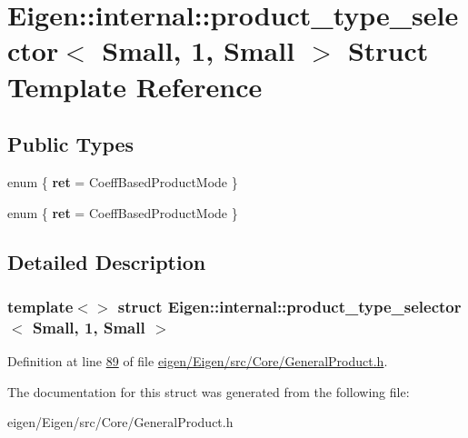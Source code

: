 \hypertarget{struct_eigen_1_1internal_1_1product__type__selector_3_01_small_00_011_00_01_small_01_4}{}\section{Eigen\+:\+:internal\+:\+:product\+\_\+type\+\_\+selector$<$ Small, 1, Small $>$ Struct Template Reference}
\label{struct_eigen_1_1internal_1_1product__type__selector_3_01_small_00_011_00_01_small_01_4}
\subsection*{Public Types}
\begin{DoxyCompactItemize}
\item 
\mbox{\label{struct_eigen_1_1internal_1_1product__type__selector_3_01_small_00_011_00_01_small_01_4_a6bee2f58c22f247c78a5f887ea8dd7e4}} 
enum \{ {\bfseries ret} = Coeff\+Based\+Product\+Mode
 \}
\item 
\mbox{\label{struct_eigen_1_1internal_1_1product__type__selector_3_01_small_00_011_00_01_small_01_4_a185afe35178c1bd26deda40dc7ee796f}} 
enum \{ {\bfseries ret} = Coeff\+Based\+Product\+Mode
 \}
\end{DoxyCompactItemize}


\subsection{Detailed Description}
\subsubsection*{template$<$$>$\newline
struct Eigen\+::internal\+::product\+\_\+type\+\_\+selector$<$ Small, 1, Small $>$}



Definition at line \hyperlink{eigen_2_eigen_2src_2_core_2_general_product_8h_source_l00089}{89} of file \hyperlink{eigen_2_eigen_2src_2_core_2_general_product_8h_source}{eigen/\+Eigen/src/\+Core/\+General\+Product.\+h}.



The documentation for this struct was generated from the following file\+:\begin{DoxyCompactItemize}
\item 
eigen/\+Eigen/src/\+Core/\+General\+Product.\+h\end{DoxyCompactItemize}
